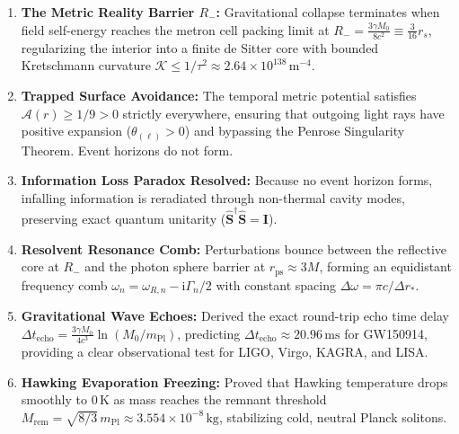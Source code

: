 \documentclass[
    12pt,
    a4paper,
    headings=normal,
    twoside=false,
    open=any,
    parskip=half
]{scrbook}
\newcommand{\iu}{\mathrm{i}}
\begin{document}
\begin{tcolorbox}[colback=maincolor!3!white, colframe=maincolor!80!black, title={\textbf{Grand Synthesis of Chapter 9}}]
\begin{enumerate}[leftmargin=1.5em, itemsep=5pt]
    \item \textbf{The Metric Reality Barrier $R_-$:} Gravitational collapse terminates when field self-energy reaches the metron cell packing limit at $R_- = \frac{3\gamma M_0}{8c^2} \equiv \frac{3}{16}r_s$, regularizing the interior into a finite de Sitter core with bounded Kretschmann curvature $\mathcal{K} \le 1/\tau^2 \approx 2.64 \times 10^{138}\,\text{m}^{-4}$.
    \item \textbf{Trapped Surface Avoidance:} The temporal metric potential satisfies $\mathcal{A}(r) \ge 1/9 > 0$ strictly everywhere, ensuring that outgoing light rays have positive expansion ($\theta_{(\ell)} > 0$) and bypassing the Penrose Singularity Theorem. Event horizons do not form.
    \item \textbf{Information Loss Paradox Resolved:} Because no event horizon forms, infalling information is reradiated through non-thermal cavity modes, preserving exact quantum unitarity ($\hat{\mathbf{S}}^\dagger \hat{\mathbf{S}} = \mathbf{I}$).
    \item \textbf{Resolvent Resonance Comb:} Perturbations bounce between the reflective core at $R_-$ and the photon sphere barrier at $r_{\text{ps}} \approx 3M$, forming an equidistant frequency comb $\omega_n = \omega_{R, n} - \iu \Gamma_n / 2$ with constant spacing $\Delta\omega = \pi c / \Delta r_*$.
    \item \textbf{Gravitational Wave Echoes:} Derived the exact round-trip echo time delay $\Delta t_{\text{echo}} = \frac{3\gamma M_0}{4c^3}\ln(M_0/m_{\text{Pl}})$, predicting $\Delta t_{\text{echo}} \approx 20.96\,\text{ms}$ for GW150914, providing a clear observational test for LIGO, Virgo, KAGRA, and LISA.
    \item \textbf{Hawking Evaporation Freezing:} Proved that Hawking temperature drops smoothly to $0\,\text{K}$ as mass reaches the remnant threshold $M_{\text{rem}} = \sqrt{8/3}\,m_{\text{Pl}} \approx 3.554 \times 10^{-8}\,\text{kg}$, stabilizing cold, neutral Planck solitons.
\end{enumerate}
\end{tcolorbox}

\end{document}
